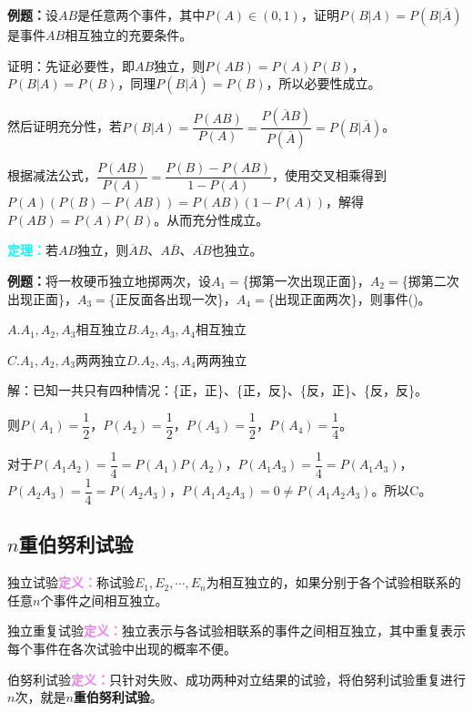 \documentclass[UTF8, 12pt]{ctexart}
\begin{document}
\textbf{例题：}设$AB$是任意两个事件，其中$P(A)\in(0,1)$，证明$P(B|A)=P(B|\overline{A})$是事件$AB$相互独立的充要条件。

证明：先证必要性，即$AB$独立，则$P(AB)=P(A)P(B)$，$P(B|A)=P(B)$，同理$P(B|\overline{A})=P(B)$，所以必要性成立。

然后证明充分性，若$P(B|A)=\dfrac{P(AB)}{P(A)}=\dfrac{P(\overline{A}B)}{P(\overline{A})}=P(B|\overline{A})$。

根据减法公式，$\dfrac{P(AB)}{P(A)}=\dfrac{P(B)-P(AB)}{1-P(A)}$，使用交叉相乘得到$P(A)(P(B)-P(AB))=P(AB)(1-P(A))$，解得$P(AB)=P(A)P(B)$。从而充分性成立。

\textcolor{aqua}{\textbf{定理：}}若$AB$独立，则$\overline{A}B$、$A\overline{B}$、$\overline{AB}$也独立。

\textbf{例题：}将一枚硬币独立地掷两次，设$A_1=$\{掷第一次出现正面\}，$A_2=$\{掷第二次出现正面\}，$A_3=$\{正反面各出现一次\}，$A_4=$\{出现正面两次\}，则事件()。

$A.A_1,A_2,A_3$相互独立\qquad$B.A_2,A_3,A_4$相互独立

$C.A_1,A_2,A_3$两两独立\qquad$D.A_2,A_3,A_4$两两独立

解：已知一共只有四种情况：\{正，正\}、\{正，反\}、\{反，正\}、\{反，反\}。

则$P(A_1)=\dfrac{1}{2}$，$P(A_2)=\dfrac{1}{2}$，$P(A_3)=\dfrac{1}{2}$，$P(A_4)=\dfrac{1}{4}$。

对于$P(A_1A_2)=\dfrac{1}{4}=P(A_1)P(A_2)$，$P(A_1A_3)=\dfrac{1}{4}=P(A_1A_3)$，$P(A_2A_3)=\dfrac{1}{4}=P(A_2A_3)$，$P(A_1A_2A_3)=0\neq P(A_1A_2A_3)$。所以C。

\subsection{\texorpdfstring{$n$重伯努利试验}{}}

独立试验\textcolor{violet}{\textbf{定义：}}称试验$E_1,E_2,\cdots,E_n$为相互独立的，如果分别于各个试验相联系的任意$n$个事件之间相互独立。

独立重复试验\textcolor{violet}{\textbf{定义：}}独立表示与各试验相联系的事件之间相互独立，其中重复表示每个事件在各次试验中出现的概率不便。

伯努利试验\textcolor{violet}{\textbf{定义：}}只针对失败、成功两种对立结果的试验，将伯努利试验重复进行$n$次，就是\textbf{$n$重伯努利试验}。
\end{document}
